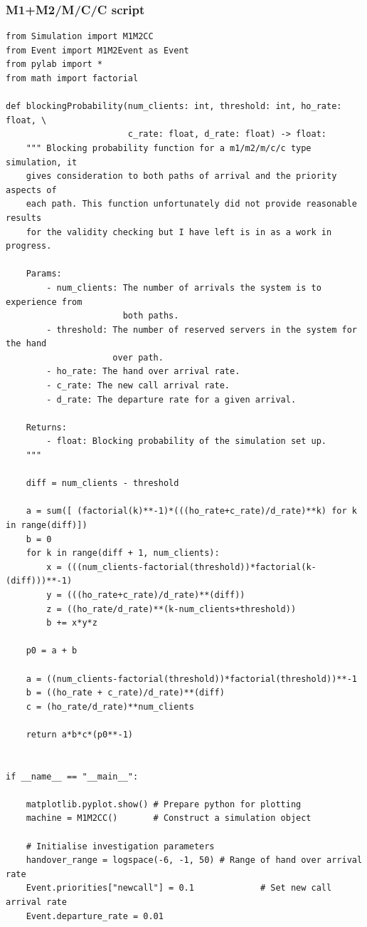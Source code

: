 \documentclass{ecmm427_assignment}
\begin{document}
\subsubsection{M1+M2/M/C/C script}
\begin{verbatim}
from Simulation import M1M2CC
from Event import M1M2Event as Event
from pylab import *
from math import factorial

def blockingProbability(num_clients: int, threshold: int, ho_rate: float, \
                        c_rate: float, d_rate: float) -> float:
    """ Blocking probability function for a m1/m2/m/c/c type simulation, it 
    gives consideration to both paths of arrival and the priority aspects of
    each path. This function unfortunately did not provide reasonable results 
    for the validity checking but I have left is in as a work in progress.

    Params:
        - num_clients: The number of arrivals the system is to experience from 
                       both paths.
        - threshold: The number of reserved servers in the system for the hand 
                     over path.
        - ho_rate: The hand over arrival rate.
        - c_rate: The new call arrival rate.
        - d_rate: The departure rate for a given arrival.

    Returns:
        - float: Blocking probability of the simulation set up.
    """

    diff = num_clients - threshold

    a = sum([ (factorial(k)**-1)*(((ho_rate+c_rate)/d_rate)**k) for k in range(diff)])
    b = 0
    for k in range(diff + 1, num_clients):
        x = (((num_clients-factorial(threshold))*factorial(k-(diff)))**-1)
        y = (((ho_rate+c_rate)/d_rate)**(diff))
        z = ((ho_rate/d_rate)**(k-num_clients+threshold))
        b += x*y*z

    p0 = a + b

    a = ((num_clients-factorial(threshold))*factorial(threshold))**-1
    b = ((ho_rate + c_rate)/d_rate)**(diff)
    c = (ho_rate/d_rate)**num_clients

    return a*b*c*(p0**-1)


if __name__ == "__main__":

    matplotlib.pyplot.show() # Prepare python for plotting
    machine = M1M2CC()       # Construct a simulation object
    
    # Initialise investigation parameters
    handover_range = logspace(-6, -1, 50) # Range of hand over arrival rate
    Event.priorities["newcall"] = 0.1             # Set new call arrival rate
    Event.departure_rate = 0.01


\end{verbatim}
\end{document}
